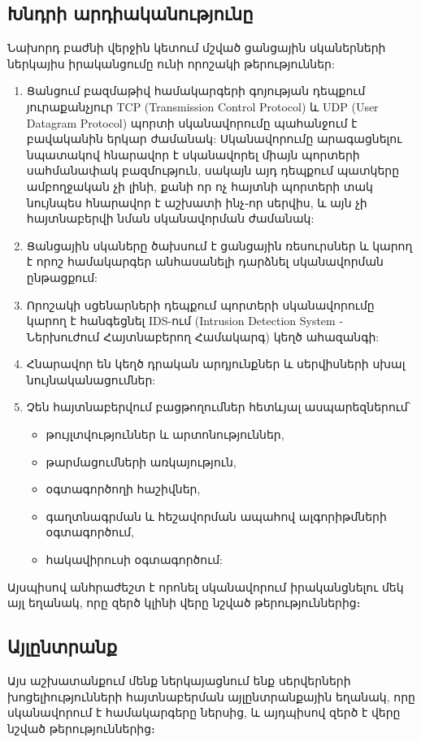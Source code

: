 \documentclass[a4paper,12pt]{article}
\begin{document}
\begin{sloppypar}
\subsection{Խնդրի արդիականությունը}


Նախորդ բաժնի վերջին կետում մշված ցանցային սկաներների ներկայիս իրականցումը
ունի որոշակի թերություններ:

\begin{enumerate}
\item Ցանցում բազմաթիվ համակարգերի գոյության դեպքում յուրաքանչյուր TCP
	(Transmission Control Protocol) և UDP (User Datagram Protocol)
	պորտի սկանավորումը պահանջում է բավականին երկար ժամանակ:
	Սկանավորումը արագացնելու նպատակով հնարավոր է սկանավորել միայն
	պորտերի սահմանափակ բազմություն, սակայն այդ դեպքում պատկերը ամբողջական
	չի լինի, քանի որ ոչ հայտնի պորտերի տակ նույնպես հնարավոր է աշխատի
	ինչ֊որ սերվիս, և այն չի հայտնաբերվի նման սկանավորման ժամանակ:
\item Ցանցային սկաները ծախսում է ցանցային ռեսուրսներ և կարող է որոշ համակարգեր
    անհասանելի դարձնել սկանավորման ընթացքում:
\item Որոշակի սցենարների դեպքում պորտերի սկանավորումը կարող է
    հանգեցնել IDS-ում (Intrusion Detection System - Ներխուժում Հայտնաբերող Համակարգ)
	կեղծ ահազանգի:
\item Հնարավոր են կեղծ դրական արդյունքներ և սերվիսների սխալ
	նույնականացումներ:
\item Չեն հայտնաբերվում բացթողումներ հետևյալ ասպարեզներում՝
	\begin{itemize}
	\item թույլտվություններ և արտոնություններ,
	\item թարմացումների առկայություն,
	\item օգտագործողի հաշիվներ,
	\item գաղտնագրման և հեշավորման ապահով ալգորիթմների օգտագործում,
	\item հակավիրուսի օգտագործում:
	\end{itemize}
\end{enumerate}

Այսպիսով անհրաժեշտ է որոնել սկանավորում իրականցնելու մեկ այլ եղանակ,
որը զերծ կլինի վերը նշված թերություններից։


\subsection{Այլընտրանք}


Այս աշխատանքում մենք ներկայացնում ենք սերվերների խոցելիությունների
հայտնաբերման այլընտրանքային եղանակ, որը սկանավորում է համակարգերը
ներսից, և այդպիսով զերծ է վերը նշված թերություններից։


\end{sloppypar}
\end{document}
